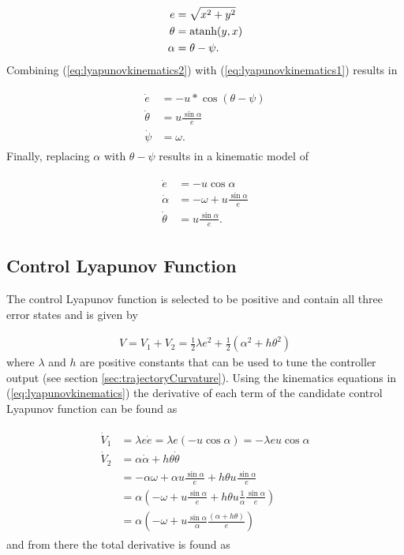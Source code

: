 \begin{align}
\label{eq:lyapunovkinematics2}
\begin{split}
e &= \sqrt{x^2+y^2} \\
\theta &= \mathop{\text{atanh}}(y,x) \\
\alpha &= \theta - \psi.
\end{split}
\end{align}
Combining (\ref{eq:lyapunovkinematics2}) with (\ref{eq:lyapunovkinematics1}) results in

\begin{align}
\label{eq:lyapunovkinematics3}
\begin{split}
\dot{e} &= -u*\cos(\theta-\psi) \\
\dot{\theta} &= u\frac{\sin\alpha}{e} \\
\dot{\psi} &= \omega.
\end{split}
\end{align}
Finally, replacing $\alpha$ with $\theta-\psi$ results in a kinematic model of

\begin{align}
\label{eq:lyapunovkinematics}
\begin{split}
\dot{e} &= -u\cos\alpha \\
\dot{\alpha} &= -\omega + u\frac{\sin\alpha}{e} \\
\dot{\theta} &= u\frac{\sin\alpha}{e}.
\end{split}
\end{align}

\subsection{Control Lyapunov Function}
\label{sec:controllyapunov}
The control Lyapunov function is selected to be positive and contain all three error states and is given by

\begin{align}
\label{eq:lyapunovfunction}
V = V_1 + V_2 = \frac{1}{2}\lambda e^2 + \frac{1}{2}\left(\alpha^2+h\theta^2\right)
\end{align}
where $\lambda$ and $h$ are positive constants that can be used to tune the controller output (see section \ref{sec:trajectoryCurvature}). Using the kinematics equations in (\ref{eq:lyapunovkinematics}) the derivative of each term of the candidate control Lyapunov function can be found as

\begin{align}
\label{eq:Vderivatives}
\begin{split}
\dot{V}_1 &= \lambda e\dot{e} = \lambda e (-u\cos\alpha) = -\lambda eu\cos\alpha \\
\dot{V}_2 &= \alpha\dot{\alpha}+h\theta\dot{\theta} \\
&= -\alpha\omega + \alpha u\frac{\sin\alpha}{e} + h\theta u\frac{\sin\alpha}{e} \\
&= \alpha\left(-\omega + u\frac{\sin\alpha}{e} + h\theta u\frac{1}{\alpha}\frac{\sin\alpha}{e}\right) \\
&= \alpha\left(-\omega + u\frac{\sin\alpha}{\alpha}\frac{(\alpha+h\theta)}{e}\right)
\end{split}
\end{align}
and from there the total derivative is found as

